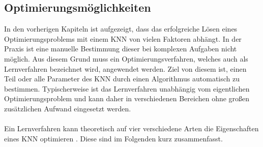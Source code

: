 \subsection{Optimierungsmöglichkeiten}
\label{subsec:optimization_strategies}
In den vorherigen Kapiteln ist aufgezeigt, dass das erfolgreiche Lösen eines Optimierungsproblems mit einem \ac{KNN} von vielen Faktoren abhängt. In der Praxis ist eine manuelle Bestimmung dieser bei komplexen Aufgaben nicht möglich. Aus diesem Grund muss ein Optimierungsverfahren, welches auch als Lernverfahren bezeichnet wird, angewendet werden. Ziel von diesem ist, einen Teil oder alle Parameter des \ac{KNN} durch einen Algorithmus automatisch zu bestimmen. Typischerweise ist das Lernverfahren unabhängig vom eigentlichen Optimierungsproblem und kann daher in verschiedenen Bereichen ohne großen zusätzlichen Aufwand eingesetzt werden. 
\\\\
Ein Lernverfahren kann theoretisch auf vier verschiedene Arten die Eigenschaften eines \ac{KNN} optimieren \cite{zell2003simulation}. Diese sind im Folgenden kurz zusammenfasst.
